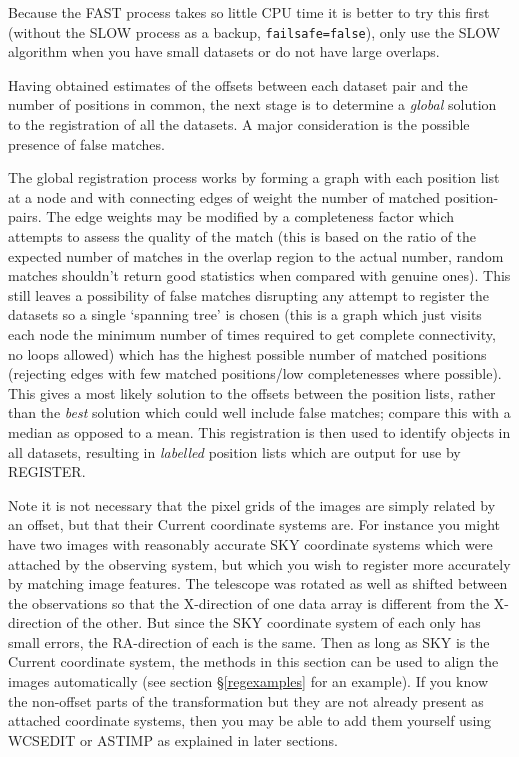 \documentclass[twoside,11pt]{article}
\renewcommand{\_}{\texttt{\symbol{95}}}
\newcommand{\text}[1]{{\small \tt #1}}
\newcommand{\routine}[1]{{\sc #1}}
\begin{document}
Because the FAST process takes so little CPU time it is better to try
this first (without the SLOW process as a backup,
\text{failsafe=false}), only use the SLOW algorithm when you have
small datasets or do not have large overlaps.

Having obtained estimates of the offsets between each dataset pair and
the number of positions in common, the next stage is to determine a
{\em global} solution to the registration of all the datasets. A major
consideration is the possible presence of false matches.

The global registration process works by forming a graph with each
position list at a node and with connecting edges of weight the number
of matched  position-pairs. The edge weights may be modified by a
completeness factor which attempts to assess the quality of the match
(this is based on the ratio of the expected number of matches in the
overlap region to the actual number, random matches shouldn't return
good statistics when compared with genuine ones). This still leaves a
possibility of false matches disrupting any attempt to register the
datasets so a single `spanning tree' is chosen (this is a graph which
just visits each node the minimum number of times required to get
complete connectivity, no loops allowed) which has the highest possible
number of matched positions (rejecting edges with few matched
positions/low completenesses where possible). This gives a most likely
solution to the offsets between the position lists, rather than the
{\em best} solution which could well include false matches; compare this
with a median as opposed to a mean. This registration is then used to
identify objects in all datasets, resulting in {\em labelled} position
lists which are output for use by \routine{REGISTER}.

Note it is not necessary that the pixel grids of the images are simply 
related by an offset,
but that their Current coordinate systems are.
For instance you might have two images with reasonably accurate
SKY coordinate systems which were attached by the observing system,
but which you wish to register more accurately by matching image features.
The telescope was rotated as well as 
shifted between the observations so that the 
X-direction of one data array is different from the X-direction of
the other.  But since the SKY coordinate system of each only 
has small errors, the RA-direction of each is the same.
Then as long as SKY is the Current coordinate system,
the methods in this section can be used to align the images automatically
(see section \S\ref{regexamples} for an example).
If you know the non-offset parts of the transformation
but they are not already present as attached coordinate systems,
then you may be able to add them yourself using \routine{WCSEDIT} 
or \routine{ASTIMP} as explained in later sections.
\end{document}
